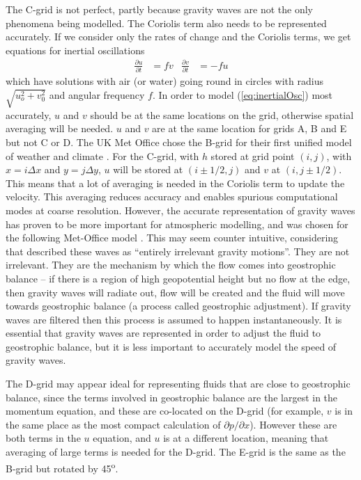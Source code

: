 The C-grid is not perfect, partly because gravity waves are not the
only phenomena being modelled. The Coriolis term also needs to be
represented accurately. If we consider only the rates of change and
the Coriolis terms, we get equations for inertial oscillations
\begin{align}
\frac{\partial u}{\partial t} & =fv & \frac{\partial v}{\partial t} & =-fu\label{eq:inertialOsc}
\end{align}
which have solutions with air (or water) going round in circles with
radius $\sqrt{u_{o}^{2}+v_{0}^{2}}$ and angular frequency $f$. In
order to model (\ref{eq:inertialOsc}) most accurately, $u$ and $v$
should be at the same locations on the grid, otherwise spatial averaging
will be needed. $u$ and $v$ are at the same location for grids A,
B and E but not C or D. The UK Met Office chose the B-grid for their
first unified model of weather and climate \citep{CD91}. For the
C-grid, with $h$ stored at grid point $\left(i,j\right)$, with $x=i\Delta x$
and $y=j\Delta y$, $u$ will be stored at $\left(i\pm1/2,j\right)$
and $v$ at $\left(i,j\pm1/2\right)$. This means that a lot of averaging
is needed in the Coriolis term to update the velocity. This averaging
reduces accuracy and enables spurious computational modes at coarse
resolution. However, the accurate representation of gravity waves
has proven to be more important for atmospheric modelling, and was
chosen for the following Met-Office model \citep{DCM+05}. This may
seem counter intuitive, considering that \citet{CFvN50} described
these waves as ``entirely irrelevant gravity motions''. They are
not irrelevant. They are the mechanism by which the flow comes into
geostrophic balance -- if there is a region of high geopotential
height but no flow at the edge, then gravity waves will radiate out,
flow will be created and the fluid will move towards geostrophic balance
(a process called geostrophic adjustment). If gravity waves are filtered
then this process is assumed to happen instantaneously. It is essential
that gravity waves are represented in order to adjust the fluid to
geostrophic balance, but it is less important to accurately model
the speed of gravity waves.

The D-grid may appear ideal for representing fluids that are close
to geostrophic balance, since the terms involved in geostrophic balance
are the largest in the momentum equation, and these are co-located
on the D-grid (for example, $v$ is in the same place as the most
compact calculation of $\partial p/\partial x$). However these are
both terms in the $u$ equation, and $u$ is at a different location,
meaning that averaging of large terms is needed for the D-grid. The
E-grid is the same as the B-grid but rotated by 45\textsuperscript{o}.

